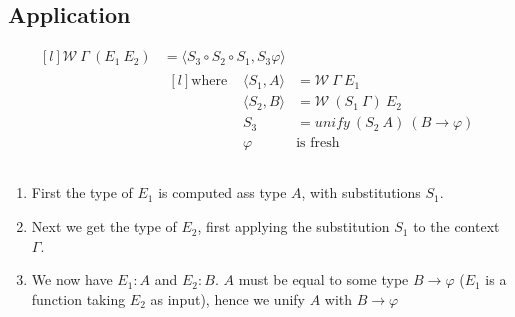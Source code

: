 \subsection{Application}

\[\begin{matrix*}[l]
		\mathcal{W} \ \Gamma \ (E_1 \ E_2) & = \langle S_3 \circ S_2 \circ S_1, S_3 \varphi \rangle \\
		& \begin{matrix*}[l]
			\text{where } & \langle S_1, A \rangle & = \mathcal{W} \ \Gamma \ E_1 \\
			& \langle S_2, B \rangle & = \mathcal{W} \ (S_1 \ \Gamma) \ E_2 \\
			& S_3 & = unify \ (S_2 \ A) \ (B \to \varphi) \\
			& \varphi & \text{is fresh} \\
		\end{matrix*} \\
	\end{matrix*}\]
\begin{enumerate}
	\item First the type of $E_1$ is computed ass type $A$, with substitutions $S_1$.
	\item Next we get the type of $E_2$, first applying the substitution $S_1$ to the context $\Gamma$.
	\item We now have $E_1 : A$ and $E_2 : B$. $A$ must be equal to some type $B \to \varphi$ ($E_1$ is a function taking $E_2$ as input), hence we unify $A$ with $B \to \varphi$
\end{enumerate}

